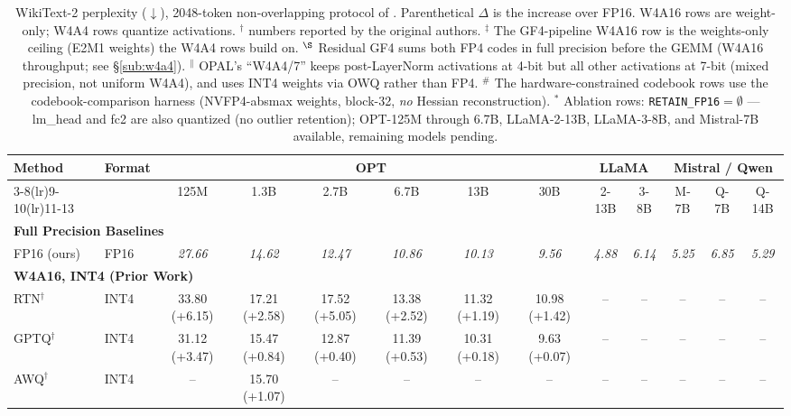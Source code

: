 \begin{table}[t]
\centering
\begingroup
\setlength{\tabcolsep}{2pt}
\scriptsize
\caption{
WikiText-2 perplexity ($\downarrow$), 2048-token non-overlapping protocol of \cite{frantar2023gptq}.
Parenthetical $\Delta$ is the increase over FP16.
W4A16 rows are weight-only; W4A4 rows quantize activations.
$^\dagger$ numbers reported by the original authors.
$^\ddagger$ The GF4-pipeline W4A16 row is the weights-only ceiling (E2M1 weights) the W4A4 rows build on.
$^\S$ Residual GF4 sums both FP4 codes in full precision before the GEMM (W4A16 throughput; see \S\ref{sub:w4a4}).
$^\parallel$ OPAL's ``W4A4/7'' keeps post-LayerNorm activations at 4-bit but all other activations at 7-bit
(mixed precision, not uniform W4A4), and uses INT4 weights via OWQ rather than FP4.
$^{\#}$ The hardware-constrained codebook rows use the codebook-comparison harness
(NVFP4-absmax weights, block-32, \emph{no} Hessian reconstruction).
$^{\ast}$ Ablation rows: \texttt{RETAIN\_FP16}$=\emptyset$ — lm\_head and fc2 are also quantized
(no outlier retention); OPT-125M through 6.7B, LLaMA-2-13B, LLaMA-3-8B, and Mistral-7B available, remaining models pending.
}
\label{tab:llm_comparison_clean}
\begin{tabular}{llccccccccccc}
\toprule
\multirow{2}{*}{Method} & \multirow{2}{*}{Format} &
\multicolumn{6}{c}{OPT} &
\multicolumn{2}{c}{LLaMA} &
\multicolumn{3}{c}{Mistral / Qwen} \\
\cmidrule(lr){3-8}\cmidrule(lr){9-10}\cmidrule(lr){11-13}
 & & 125M & 1.3B & 2.7B & 6.7B & 13B & 30B & 2-13B & 3-8B & M-7B & Q-7B & Q-14B \\
\midrule
\multicolumn{13}{l}{\textbf{Full Precision Baselines}} \\
FP16 (ours)
  & FP16
  & \textit{27.66} & \textit{14.62} & \textit{12.47} & \textit{10.86}
  & \textit{10.13} & \textit{9.56}  & \textit{4.88}  & \textit{6.14}
  & \textit{5.25}  & \textit{6.85}  & \textit{5.29}  \\
\midrule
\multicolumn{13}{l}{\textbf{W4A16, INT4 (Prior Work)}} \\
RTN$^\dagger$
  & INT4
  & 33.80 (+6.15) & 17.21 (+2.58) & 17.52 (+5.05) & 13.38 (+2.52)
  & 11.32 (+1.19) & 10.98 (+1.42) & -- & -- & -- & -- & -- \\
GPTQ$^\dagger$~\cite{frantar2023gptq}
  & INT4
  & 31.12 (+3.47) & 15.47 (+0.84) & 12.87 (+0.40) & 11.39 (+0.53)
  & 10.31 (+0.18) & 9.63 (+0.07)  & -- & -- & -- & -- & -- \\
AWQ$^\dagger$~\cite{lin2023awq}
  & INT4
  & -- & 15.70 (+1.07) & -- & -- & -- & -- & -- & -- & -- & -- & -- \\

\end{tabular}
\end{table}
